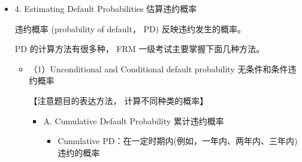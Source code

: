 \begin{itemize}
\begin{itemize}
\begin{itemize}
        \({\mathrm{X}}_{1}\) : 周转资金与总资产之比、=
        
        \({\mathrm{X}}_{2}\) : 留存收益与总资产之比
        
        \({\mathrm{X}}_{3}\) : 息税前利润与总资产之比
        
        \({\mathrm{X}}_{4}\) : 股本市值与总负债账面价值之比
        
        \({\mathrm{X}}_{5}\) : 销售额与总资产之比
        
        \item  判断:
        
        Z-score>3.0，不太可能违约
        
        \({2.7} < \mathrm{Z}\) -score \(< {3.0}\) ， 警惕
        
        \({1.8} < \mathrm{Z}\) -score \(< {2.7}\) ，有很大的违约可能性
        
        Z-score<1.8， 违约概率很高
        
        \item 【Z-score 只能得出违约与否的大概说明， 不能得出违约概率具体是多少】
        
        \item 【Z-Score 是基于 66 家公开交易的制造业公司样本估算的。该模型在样本外测试时表现相当准确。此外， 随着时间的推移， Z-Score 已经发展和扩展， 适用于非公开交易的制造业公司和非制造业行业。】
    \end{itemize}
\end{itemize}


    
    \item 4. Estimating Default Probabilities 估算违约概率
    
    违约概率 (probability of default， PD) 反映违约发生的概率。

    PD 的计算方法有很多种， FRM 一级考试主要掌握下面几种方法。
    \begin{itemize}
        \item （1）Unconditional and Conditional default probability 无条件和条件违约概率
        
        【注意题目的表达方法， 计算不同种类的概率】

            \begin{itemize}
            \item A. Cumulative Default Probability 累计违约概率
                \begin{itemize}
        
                \item  Cumulative PD：在一定时期内(例如，一年内、两年内、三年内)违约的概率
                

\end{itemize}
\end{itemize}
\end{itemize}
\end{itemize}
